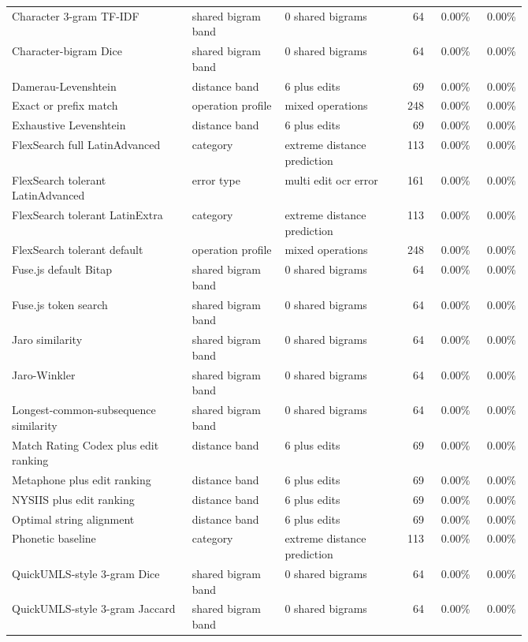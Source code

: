 \begin{scriptsize}
\begin{longtable}{@{}L{0.35\linewidth}L{0.18\linewidth}L{0.23\linewidth}rrr@{}}
Character 3-gram TF-IDF & shared bigram band & 0 shared bigrams & 64 & 0.00\% & 0.00\% \\
Character-bigram Dice & shared bigram band & 0 shared bigrams & 64 & 0.00\% & 0.00\% \\
Damerau-Levenshtein & distance band & 6 plus edits & 69 & 0.00\% & 0.00\% \\
Exact or prefix match & operation profile & mixed operations & 248 & 0.00\% & 0.00\% \\
Exhaustive Levenshtein & distance band & 6 plus edits & 69 & 0.00\% & 0.00\% \\
FlexSearch full LatinAdvanced & category & extreme distance prediction & 113 & 0.00\% & 0.00\% \\
FlexSearch tolerant LatinAdvanced & error type & multi edit ocr error & 161 & 0.00\% & 0.00\% \\
FlexSearch tolerant LatinExtra & category & extreme distance prediction & 113 & 0.00\% & 0.00\% \\
FlexSearch tolerant default & operation profile & mixed operations & 248 & 0.00\% & 0.00\% \\
Fuse.js default Bitap & shared bigram band & 0 shared bigrams & 64 & 0.00\% & 0.00\% \\
Fuse.js token search & shared bigram band & 0 shared bigrams & 64 & 0.00\% & 0.00\% \\
Jaro similarity & shared bigram band & 0 shared bigrams & 64 & 0.00\% & 0.00\% \\
Jaro-Winkler & shared bigram band & 0 shared bigrams & 64 & 0.00\% & 0.00\% \\
Longest-common-subsequence similarity & shared bigram band & 0 shared bigrams & 64 & 0.00\% & 0.00\% \\
Match Rating Codex plus edit ranking & distance band & 6 plus edits & 69 & 0.00\% & 0.00\% \\
Metaphone plus edit ranking & distance band & 6 plus edits & 69 & 0.00\% & 0.00\% \\
NYSIIS plus edit ranking & distance band & 6 plus edits & 69 & 0.00\% & 0.00\% \\
Optimal string alignment & distance band & 6 plus edits & 69 & 0.00\% & 0.00\% \\
Phonetic baseline & category & extreme distance prediction & 113 & 0.00\% & 0.00\% \\
QuickUMLS-style 3-gram Dice & shared bigram band & 0 shared bigrams & 64 & 0.00\% & 0.00\% \\
QuickUMLS-style 3-gram Jaccard & shared bigram band & 0 shared bigrams & 64 & 0.00\% & 0.00\% \\

\end{longtable}
\end{scriptsize}
